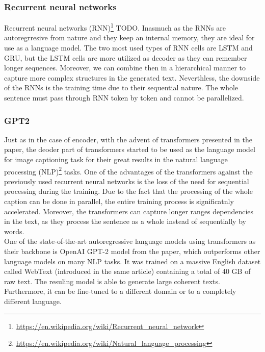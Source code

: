 \subsubsection{Recurrent neural networks}
Recurrent neural networks (RNN)\footnote[1]{\url{https://en.wikipedia.org/wiki/Recurrent\_neural\_network}} TODO. Inasmuch as the RNNs are autoregrresive from nature and they keep an internal memory, they are ideal for use as a language model. The two most used types of RNN cells are LSTM\citep{hochreiter1997long} and GRU\citep{cho2014learning}, but the LSTM cells are more utilized as decoder as they can remember longer sequences. Moreover, we can combine then in a hierarchical manner to capture more complex structures in the generated text. Neverthless, the downside of the RNNs is the training time due to their sequential nature. The whole sentence must pass through RNN token by token and cannot be parallelized.

\subsubsection{GPT2}
Just as in the case of encoder, with the advent of transformers presented in the \citet{vaswani2017attention} paper, the deoder part of transformers started to be used as the language model for image captioning task for their great results in the natural language processing (NLP)\footnote[1]{\url{https://en.wikipedia.org/wiki/Natural\_language\_processing}} tasks. One of the advantages of the transformers against the previously used recurrent neural networks is the loss of the need for sequential processing during the training. Due to the fact that the processing of the whole caption can be done in parallel, the entire training process is significatnly accelerated. Moreover, the transformers can capture longer ranges dependencies in the text, as they process the sentence as a whole instead of sequentially by words.\\

One of the state-of-the-art autoregressive language models using transformers as their backbone is OpenAI GPT-2 model from the \citet{radford2019language} paper, which outperforms other language models on many NLP tasks. It was trained on a massive English dataset called WebText (introduced in the same article) containing a total of 40 GB of raw text. The resuling model is able to generate large coherent texts. Furthermore, it can be fine-tuned to a different domain or to a completely different language.

